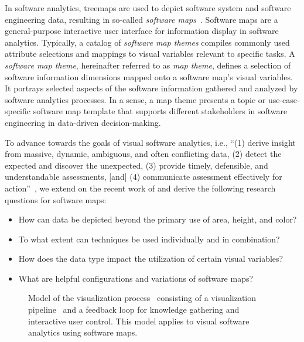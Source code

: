 \documentclass{svjour3}                     %
\begin{document}
In software analytics, treemaps are used to depict software system and software engineering data, resulting in so-called \emph{software maps}~\citep{limberger2019-softwaremaps}.
Software maps are a general-purpose interactive user interface for information display in software analytics.
Typically, a catalog of \emph{software map themes} compiles commonly used attribute selections and mappings to visual variables relevant to specific tasks.
A \emph{software map theme}, hereinafter referred to as \emph{map theme}, defines a selection of software information dimensions mapped onto a software map's visual variables.
It portrays selected aspects of the software information gathered and analyzed by software analytics processes.
In a sense, a map theme presents a topic or use-case-specific software map template that supports different stakeholders in software engineering in data-driven decision-making.

To advance towards the goals of visual software analytics, i.e., \enquote{(1) derive insight from massive, dynamic, ambiguous, and often conflicting data, (2) detect the expected and discover the unexpected, (3) provide timely, defensible, and understandable assessments, [and] (4) communicate assessment effectively for action}~\citep{keim2008-visual}, we extend on the recent work of \cite{limberger2019-softwaremaps} and derive the following research questions for software maps:
\begin{itemize}
	\item How can data be depicted beyond the primary use of area, height, and color?
	\item To what extent can techniques be used individually and in combination?
	\item How does the data type impact the utilization of certain visual variables?
	\item What are helpful configurations and variations of software maps?
\end{itemize}

\begin{figure}[t]
	\centering
	
	\caption{%
	    Model of the visualization process~\citep{wijk2005-visualization} consisting of a visualization pipeline~\citep{santos2004-gaining} and a feedback loop for knowledge gathering and interactive user control. 
	    This model applies to visual software analytics using software maps.}
	\label{fig:visualization-process}
\end{figure}
\end{document}
